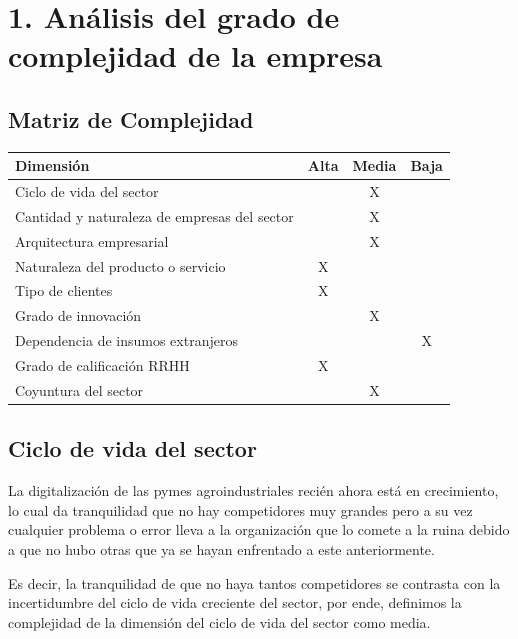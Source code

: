 \documentclass[man,12pt]{apa7}
\begin{document}
\doublespacing %

\section{1. Análisis del grado de complejidad de la empresa}

\subsection{Matriz de Complejidad}

\begin{center}
\begin{tabular}{|l|c|c|c|}
\hline
\textbf{Dimensión} & \textbf{Alta} & \textbf{Media} & \textbf{Baja} \\
\hline
Ciclo de vida del sector &  & X &  \\
\hline
Cantidad y naturaleza de empresas del sector &  & X &  \\
\hline
Arquitectura empresarial &  & X &  \\
\hline
Naturaleza del producto o servicio & X &  &  \\
\hline
Tipo de clientes & X &  &  \\
\hline
Grado de innovación &  & X &  \\
\hline
Dependencia de insumos extranjeros &  &  & X \\
\hline
Grado de calificación RRHH & X &  &  \\
\hline
Coyuntura del sector &  & X &  \\
\hline
\end{tabular}
\end{center}

\subsection{Ciclo de vida del sector}

La digitalización de las pymes agroindustriales recién ahora está en crecimiento, lo cual da tranquilidad que no hay competidores muy grandes pero a su vez cualquier problema o error lleva a la organización que lo comete a la ruina debido a que no hubo otras que ya se hayan enfrentado a este anteriormente.

Es decir, la tranquilidad de que no haya tantos competidores se contrasta con la incertidumbre del ciclo de vida creciente del sector, por ende, definimos la complejidad de la dimensión del ciclo de vida del sector como media.
\end{document}
